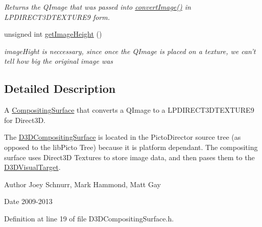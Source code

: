 \begin{DoxyCompactItemize}
\begin{DoxyCompactList}\small\item\em Returns the Q\-Image that was passed into \hyperlink{class_picto_1_1_d3_d_compositing_surface_a843af9d14affbb813878c5289c223782}{convert\-Image()} in L\-P\-D\-I\-R\-E\-C\-T3\-D\-T\-E\-X\-T\-U\-R\-E9 form. \end{DoxyCompactList}\item 
\hypertarget{class_picto_1_1_d3_d_compositing_surface_a9ca4b719398dfb3e3d51eeee23590627}{unsigned int \hyperlink{class_picto_1_1_d3_d_compositing_surface_a9ca4b719398dfb3e3d51eeee23590627}{get\-Image\-Height} ()}\label{class_picto_1_1_d3_d_compositing_surface_a9ca4b719398dfb3e3d51eeee23590627}

\begin{DoxyCompactList}\small\item\em image\-Hight is neccessary, since once the Q\-Image is placed on a texture, we can't tell how big the original image was \end{DoxyCompactList}\end{DoxyCompactItemize}


\subsection{Detailed Description}
A \hyperlink{struct_picto_1_1_compositing_surface}{Compositing\-Surface} that converts a Q\-Image to a L\-P\-D\-I\-R\-E\-C\-T3\-D\-T\-E\-X\-T\-U\-R\-E9 for Direct3\-D. 

The \hyperlink{class_picto_1_1_d3_d_compositing_surface}{D3\-D\-Compositing\-Surface} is located in the Picto\-Director source tree (as opposed to the lib\-Picto Tree) because it is platform dependant. The compositing surface uses Direct3\-D Textures to store image data, and then pases them to the \hyperlink{class_picto_1_1_d3_d_visual_target}{D3\-D\-Visual\-Target}. \begin{DoxyAuthor}{Author}
Joey Schnurr, Mark Hammond, Matt Gay 
\end{DoxyAuthor}
\begin{DoxyDate}{Date}
2009-\/2013 
\end{DoxyDate}


Definition at line 19 of file D3\-D\-Compositing\-Surface.\-h.



